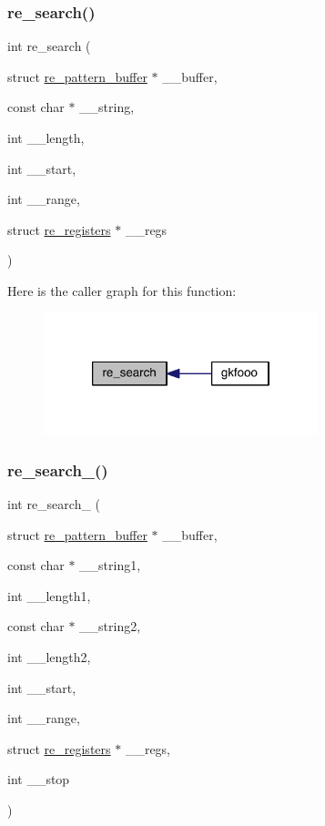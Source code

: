 \subsubsection{\texorpdfstring{re\+\_\+search()}{re\_search()}}
{\footnotesize\ttfamily int re\+\_\+search (\begin{DoxyParamCaption}\item[{struct \hyperlink{a00686}{re\+\_\+pattern\+\_\+buffer} $\ast$}]{\+\_\+\+\_\+buffer,  }\item[{const char $\ast$}]{\+\_\+\+\_\+string,  }\item[{int}]{\+\_\+\+\_\+length,  }\item[{int}]{\+\_\+\+\_\+start,  }\item[{int}]{\+\_\+\+\_\+range,  }\item[{struct \hyperlink{a00690}{re\+\_\+registers} $\ast$}]{\+\_\+\+\_\+regs }\end{DoxyParamCaption})}

Here is the caller graph for this function\+:\nopagebreak
\begin{figure}[H]
\begin{center}
\leavevmode
\includegraphics[width=226pt]{a00092_a25ace2eeda73683578852e4fb076ffd3_icgraph}
\end{center}
\end{figure}
\mbox{\label{a00092_a800bad488847a47475a7338a62c02ab7}} 
\subsubsection{\texorpdfstring{re\+\_\+search\+\_()}{re\_search\_2()}}
{\footnotesize\ttfamily int re\+\_\+search\+\_ (\begin{DoxyParamCaption}\item[{struct \hyperlink{a00686}{re\+\_\+pattern\+\_\+buffer} $\ast$}]{\+\_\+\+\_\+buffer,  }\item[{const char $\ast$}]{\+\_\+\+\_\+string1,  }\item[{int}]{\+\_\+\+\_\+length1,  }\item[{const char $\ast$}]{\+\_\+\+\_\+string2,  }\item[{int}]{\+\_\+\+\_\+length2,  }\item[{int}]{\+\_\+\+\_\+start,  }\item[{int}]{\+\_\+\+\_\+range,  }\item[{struct \hyperlink{a00690}{re\+\_\+registers} $\ast$}]{\+\_\+\+\_\+regs,  }\item[{int}]{\+\_\+\+\_\+stop }\end{DoxyParamCaption})}

